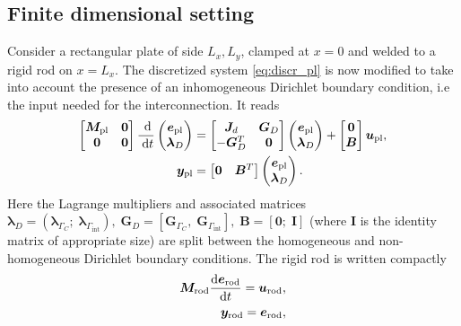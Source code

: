 \documentclass[letterpaper, 10 pt, conference]{ieeeconf}
\begin{document}
\subsection{Finite dimensional setting}
Consider a rectangular plate of side $L_x, L_y$, clamped at $x=0$ and welded to a rigid rod on $x=L_x$. The discretized system \ref{eq:discr_pl} is now modified to take into account the presence of an inhomogeneous Dirichlet boundary condition, i.e the input needed for the interconnection. It reads
\begin{equation}
\begin{aligned}
\begin{bmatrix}
\bm{M}_{\text{pl}} & \bm{0} \\
\bm{0} & \bm{0} \\
\end{bmatrix}\frac{\d}{\d t}
\begin{pmatrix}
\bm{e}_{\text{pl}}\\
\bm{\lambda}_D \\
\end{pmatrix}
&= \begin{bmatrix}
\bm{J}_d & \bm{G}_D \\
-\bm{G}_D^T & \bm{0} \\
\end{bmatrix}
\begin{pmatrix}
\bm{e}_{\text{pl}}\\
\bm{\lambda}_D \\
\end{pmatrix} + \begin{bmatrix}
\bm{0} \\
\bm{B} \\
\end{bmatrix} \bm{u}_{\text{pl}}, \\
\bm{y}_{\text{pl}} &= \begin{bmatrix}
\bm{0} & \bm{B}^T \\
\end{bmatrix} \begin{pmatrix}
\bm{e}_{\text{pl}}\\
\bm{\lambda}_D \\
\end{pmatrix}.
\end{aligned} 
\end{equation}
Here the Lagrange multipliers and associated matrices $\bm{\lambda}_D =  (\bm\lambda_{\Gamma_{C}}; \; \bm\lambda_{\Gamma_{\text{int}}} ), \; \bm{G}_D = [\bm{G}_{\Gamma_{C}}, \; \bm{G}_{\Gamma_{\text{int}}}], \; \bm{B} = [\bm{0}; \; \bm{I}]$ (where $\bm{I}$ is the identity matrix of appropriate size) are split between the homogeneous and non-homogeneous Dirichlet boundary conditions. The rigid rod is written compactly 
\begin{equation}
\begin{aligned}
\bm{M}_{\text{rod}} \diff{\bm{e}_{\text{rod}}}{t} = \bm{u}_{\text{rod}}, \\
\bm{y}_{\text{rod}} = \bm{e}_{\text{rod}},
\end{aligned}
\end{equation}
\end{document}
